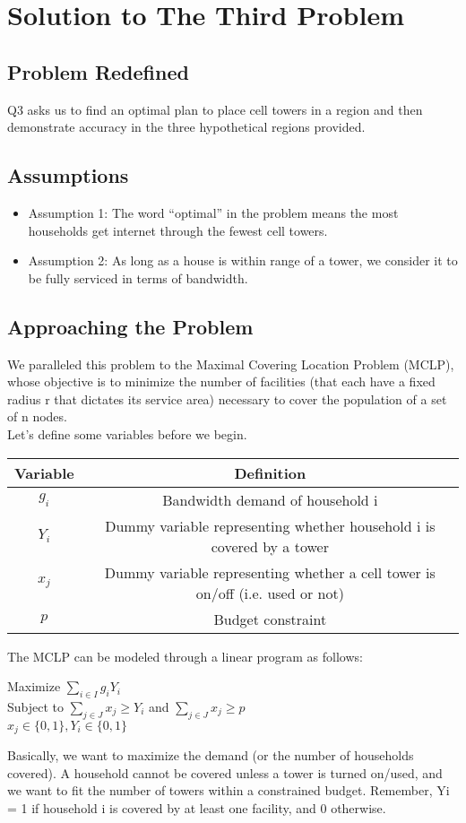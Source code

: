  
\section{Solution to The Third Problem}
	\subsection{Problem Redefined}
	Q3 asks us to find an optimal plan to place cell towers in a region and then demonstrate accuracy in the three hypothetical regions provided.
		
	\subsection{Assumptions}
	\begin{itemize}
	\item Assumption 1: The word “optimal” in the problem means the most households get internet through the fewest cell towers.
	\item Assumption 2: As long as a house is within range of a tower, we consider it to be fully serviced in terms of bandwidth.
	\end{itemize}

	\subsection{Approaching the Problem}
	We paralleled this problem to the Maximal Covering Location Problem (MCLP), whose objective is to minimize the number of facilities (that each have a fixed radius r that dictates its service area) necessary to cover the population of a set of n nodes.\\
	\indent Let’s define some variables before we begin.
	\begin{center} \begin{tabular} {|c|c|}
		\hline
		Variable & Definition \\
		\hline
		$g_i$ & Bandwidth demand of household i\\
		\hline
		$Y_i$ & Dummy variable representing whether household i is covered by a tower \\
		\hline
		$x_j$ & Dummy variable representing whether a cell tower is on/off (i.e. used or not) \\
		\hline
		$p$ & Budget constraint \\
		\hline
	\end{tabular} \end{center}
	\indent The MCLP can be modeled through a linear program as follows:
	\begin{center}
		Maximize $\sum_{i\in I} g_iY_i$ \\
		Subject to $\sum_{j\in J}x_j \geq Y_i$ and $\sum_{j\in J}x_j \geq p$ \\
		$x_j \in \{0,1\}, Y_i \in \{0,1\}$
	\end{center}
	Basically, we want to maximize the demand (or the number of households covered). A household cannot be covered unless a tower is turned on/used, and we want to fit the number of towers within a constrained budget. Remember, Yi = 1 if household i is covered by at least one facility, and 0 otherwise.

